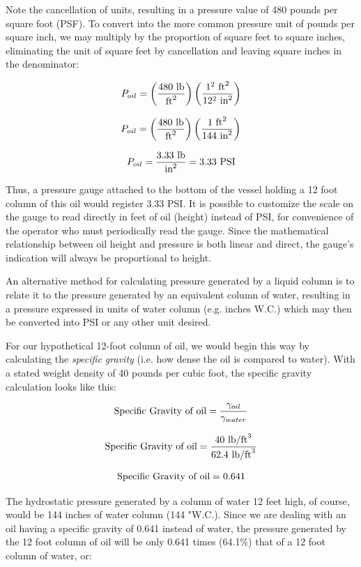 \filbreak

Note the cancellation of units, resulting in a pressure value of 480 pounds per square foot (PSF).  To convert into the more common pressure unit of pounds per square inch, we may multiply by the proportion of square feet to square inches, eliminating the unit of square feet by cancellation and leaving square inches in the denominator:

$$P_{oil} = \left({480 \hbox{ lb} \over \hbox{ft}^2 }\right) \left({1^2 \hbox{ ft}^2 \over 12^2 \hbox{ in}^2 }\right)$$

$$P_{oil} = \left({480 \hbox{ lb} \over \hbox{ft}^2 }\right) \left({1 \hbox{ ft}^2 \over 144 \hbox{ in}^2 }\right)$$

$$P_{oil} = {3.33 \hbox{ lb} \over \hbox{in}^2 } = 3.33 \hbox{ PSI}$$

Thus, a pressure gauge attached to the bottom of the vessel holding a 12 foot column of this oil would register $3.33$ PSI.  It is possible to customize the scale on the gauge to read directly in feet of oil (height) instead of PSI, for convenience of the operator who must periodically read the gauge.  Since the mathematical relationship between oil height and pressure is both linear and direct, the gauge's indication will always be proportional to height.

\vskip 10pt

\filbreak

An alternative method for calculating pressure generated by a liquid column is to relate it to the pressure generated by an equivalent column of water, resulting in a pressure expressed in units of water column (e.g. inches W.C.) which may then be converted into PSI or any other unit desired.

For our hypothetical 12-foot column of oil, we would begin this way by calculating the \textit{specific gravity} (i.e. how dense the oil is compared to water).  With a stated weight density of 40 pounds per cubic foot, the specific gravity calculation looks like this:    

$$\hbox{Specific Gravity of oil} = {\gamma_{oil} \over \gamma_{water}}$$

$$\hbox{Specific Gravity of oil} = {40 \hbox{ lb/ft}^3 \over 62.4 \hbox{ lb/ft}^3}$$

$$\hbox{Specific Gravity of oil} = 0.641$$

The hydrostatic pressure generated by a column of water 12 feet high, of course, would be 144 inches of water column (144 "W.C.).  Since we are dealing with an oil having a specific gravity of 0.641 instead of water, the pressure generated by the 12 foot column of oil will be only 0.641 times (64.1\%) that of a 12 foot column of water, or:


